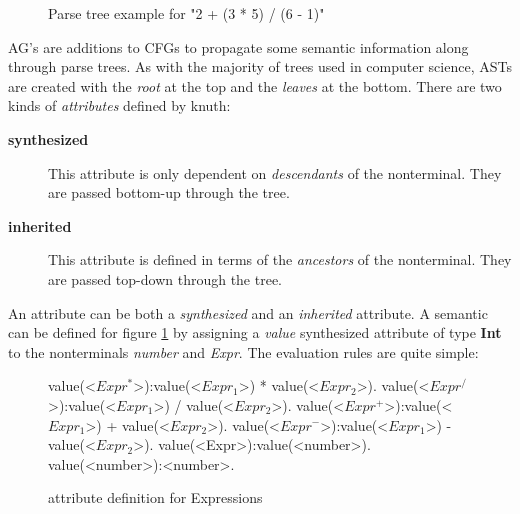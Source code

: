 \begin{figure}[H]
\centering
{}
\caption{Parse tree example for "2 + (3 * 5) / (6 - 1)"}
\label{fig.example1.parsetree}
\end{figure}

AG's are additions to CFGs to propagate some semantic information along through parse trees. As with the majority of trees used in computer science, ASTs are created with the \emph{root} at the top and the \emph{leaves} at the bottom. There are two kinds of \emph{attributes} defined by knuth\cite{knuth1}:
\begin{description}
\item[\textbf{synthesized}] This attribute is only dependent on \emph{descendants} of the nonterminal. They are passed bottom-up through the tree.
\item[\textbf{inherited}] This attribute is defined in terms of the \emph{ancestors} of the nonterminal. They are passed top-down through the tree.
\end{description}

An attribute can be both a \emph{synthesized} and an \emph{inherited} attribute.
A semantic can be defined for figure \ref{fig.example1.parsetree} by assigning a \emph{value} synthesized attribute of type \textbf{Int} to the nonterminals \emph{number} and \emph{Expr}. The evaluation rules are quite simple:

\begin{figure}[H]
\begin{grammar}
value(<$Expr^*$>):value(<$Expr_1$>) * value(<$Expr_2$>). 
value(<$Expr^/$>):value(<$Expr_1$>) / value(<$Expr_2$>). 
value(<$Expr^+$>):value(<$Expr_1$>) + value(<$Expr_2$>). 
value(<$Expr^-$>):value(<$Expr_1$>) - value(<$Expr_2$>). 
value(<Expr>):value(<number>).
value(<number>):<number>.
\end{grammar}
\caption{attribute definition for Expressions}
\label{semantics:bnf:expr}
\end{figure}

